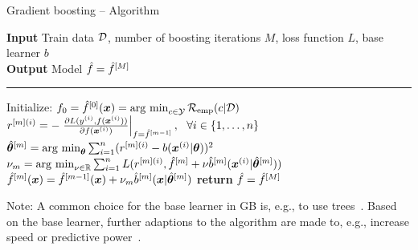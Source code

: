 \documentclass[10pt]{beamer}
\begin{document}
\begin{frame}{Gradient boosting -- Algorithm}

  \begin{algorithm}[H]
  \footnotesize
  \caption{GB algorithm}\label{algo:gb}
  \hspace*{\algorithmicindent} \textbf{Input} Train data $\mathcal{D}$, number of boosting iterations $M$, loss function $L$, base learner $b$\\
  \hspace*{\algorithmicindent} \textbf{Output} Model $\hat{f} = \hat{f}^{[M]}$\vspace{0.1cm}
  \hrule
  \begin{algorithmic}[1]
      \State Initialize: $f_0 = \hat{f}^{[0]}(\bm{x}) = \operatorname{arg~min}_{c\in\mathcal{Y}}\mathcal{R}_{\text{emp}}(c|\mathcal{D})$
          \State $r^{[m](i)} = -\left.\frac{\partial L(y^{(i)}, f(\bm{x}^{(i)}))}{\partial f(\bm{x}^{(i)})}\right|_{f = \hat{f}^{[m-1]}},\ \ \forall i \in \{1, \dots, n\}$
          \State $\hat{\bm{\theta}}^{[m]} = \operatorname{arg~min}_{\bm{\theta}} \sum_{i=1}^n(r^{[m](i)} - b(\bm{x}^{(i)} | \bm{\theta}))^2$
          \State $\nu_m = \operatorname{arg~min}_{\nu\in\mathbb{R}} \sum_{i=1}^n L(r^{[m](i)}, \hat{f}^{[m]} + \nu \hat{b}^{[m]}(\bm{x}^{(i)} | \hat{\bm{\theta}}^{[m]}))$
          \State $\hat{f}^{[m]}(\bm{x}) = \hat{f}^{[m-1]}(\bm{x}) + \nu_m \hat{b}^{[m]}(\bm{x} | \hat{\bm{\theta}}^{[m]})$
      \EndWhile
      \State \textbf{return} $\hat{f} = \hat{f}^{[M]}$
  \EndProcedure
  \end{algorithmic}
  \end{algorithm}
  \vspace{-0.5cm}
  Note: A common choice for the base learner in GB is, e.g., to use trees~\citep{friedman2001greedy}. Based on the base learner, further adaptions to the algorithm are made to, e.g., increase speed or predictive power~\citep{chen2015xgboost}.
\end{frame}
\end{document}
